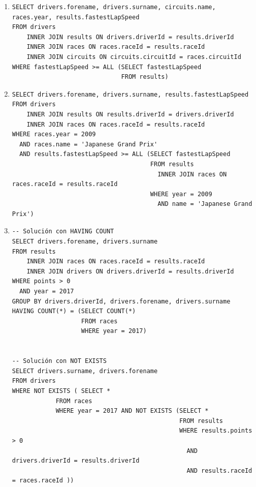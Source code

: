 \documentclass[a4paper]{article}
\begin{document}
\begin{enumerate}
    \item %
    \begin{verbatim}  
SELECT drivers.forename, drivers.surname, circuits.name, races.year, results.fastestLapSpeed
FROM drivers
    INNER JOIN results ON drivers.driverId = results.driverId
    INNER JOIN races ON races.raceId = results.raceId
    INNER JOIN circuits ON circuits.circuitId = races.circuitId
WHERE fastestLapSpeed >= ALL (SELECT fastestLapSpeed
                              FROM results)
    \end{verbatim}
    
    \item %
    \begin{verbatim}                
SELECT drivers.forename, drivers.surname, results.fastestLapSpeed
FROM drivers
	INNER JOIN results ON results.driverId = drivers.driverId
    INNER JOIN races ON races.raceId = results.raceId
WHERE races.year = 2009
  AND races.name = 'Japanese Grand Prix'
  AND results.fastestLapSpeed >= ALL (SELECT fastestLapSpeed
									  FROM results
										INNER JOIN races ON races.raceId = results.raceId
									  WHERE year = 2009
                                        AND name = 'Japanese Grand Prix')
    \end{verbatim}             

    \item %
    \begin{verbatim}  
-- Solución con HAVING COUNT        
SELECT drivers.forename, drivers.surname
FROM results
	INNER JOIN races ON races.raceId = results.raceId
    INNER JOIN drivers ON drivers.driverId = results.driverId
WHERE points > 0
  AND year = 2017
GROUP BY drivers.driverId, drivers.forename, drivers.surname
HAVING COUNT(*) = (SELECT COUNT(*)
				   FROM races
                   WHERE year = 2017)

                             
-- Solución con NOT EXISTS 
SELECT drivers.surname, drivers.forename
FROM drivers
WHERE NOT EXISTS ( SELECT *
            FROM races
            WHERE year = 2017 AND NOT EXISTS (SELECT *
                                              FROM results
                                              WHERE results.points > 0 
                                                AND drivers.driverId = results.driverId 
                                                AND results.raceId = races.raceId ))
    \end{verbatim}  
    

\end{enumerate}
\end{document}
